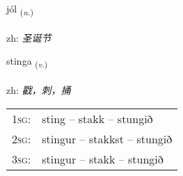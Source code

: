 \documentclass[frontgrid, backgrid]{flacards}\usepackage[]{graphicx}\usepackage[]{color}
\begin{document}
\renewcommand{\flhead}{\vskip5pt \fboxsep=0pt {\small\bfseries\footnotesize Nafnorð | 名词}}
\renewcommand{\fcfoot}{\vskip5pt \fboxsep=0pt \hspace{2pt}{\small\bfseries\footnotesize 2K}}

\renewcommand{\blhead}{\vskip5pt {\small\bfseries\footnotesize Nafnorð | 名词 }}
\renewcommand{\bcfoot}{\vskip5pt \hspace{2pt}{\small\bfseries\footnotesize 2K}}


{jól \small{\textsubscript{(\textit{n.})}} \\[1ex] %
\textphonetic{[jouːl]} \\
zh: \emph{圣诞节} \\  [2ex]
\renewcommand*{\arraystretch}{0.8}
}

\renewcommand{\flhead}{\vskip5pt \fboxsep=0pt {\small\bfseries\footnotesize Sagnorð | 动词}}
\renewcommand{\fcfoot}{\vskip5pt \fboxsep=0pt \hspace{2pt}{\small\bfseries\footnotesize 2K}}

\renewcommand{\blhead}{\vskip5pt {\small\bfseries\footnotesize Sagnorð | 动词 }}
\renewcommand{\bcfoot}{\vskip5pt \hspace{2pt}{\small\bfseries\footnotesize 2K}}


{stinga \small{\textsubscript{(\textit{v.})}} \\[1ex] %
\textphonetic{[stiŋka]} \\
zh: \emph{戳，刺，捅} \\  [2ex]
\renewcommand*{\arraystretch}{0.8}
\begin{tabular}{p{1cm}l}
\textsc{1sg}: & sting -- stakk -- stungið \\ 
\textsc{2sg}: & stingur -- stakkst -- stungið \\ 
\textsc{3sg}: & stingur -- stakk -- stungið \\ 
\end{tabular}
}
\end{document}
